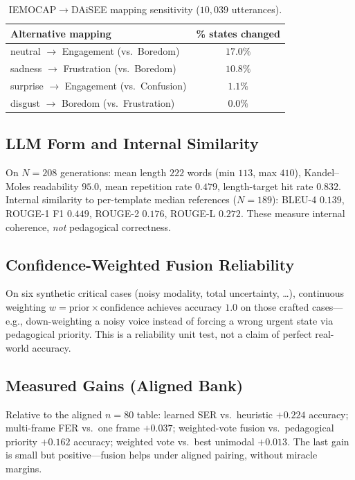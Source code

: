\documentclass[conference]{IEEEtran}
\begin{document}
\begin{table}[!t]
\caption{IEMOCAP$\rightarrow$DAiSEE mapping sensitivity ($10{,}039$ utterances).}
\label{tab:map}
\centering
\begin{tabular}{@{}lc@{}}
\toprule
\textbf{Alternative mapping} & \textbf{\% states changed} \\
\midrule
neutral $\rightarrow$ Engagement (vs.\ Boredom) & $17.0\%$ \\
sadness $\rightarrow$ Frustration (vs.\ Boredom) & $10.8\%$ \\
surprise $\rightarrow$ Engagement (vs.\ Confusion) & $1.1\%$ \\
disgust $\rightarrow$ Boredom (vs.\ Frustration) & $0.0\%$ \\
\bottomrule
\end{tabular}
\end{table}

\subsection{LLM Form and Internal Similarity}
On $N{=}208$ generations: mean length $222$ words (min $113$, max $410$),
Kandel--Moles readability $95.0$, mean repetition rate $0.479$, length-target
hit rate $0.832$. Internal similarity to per-template median references
($N{=}189$): BLEU-4 $0.139$, ROUGE-1 F1 $0.449$, ROUGE-2 $0.176$, ROUGE-L
$0.272$. These measure internal coherence, \emph{not} pedagogical
correctness.

\subsection{Confidence-Weighted Fusion Reliability}
On six synthetic critical cases (noisy modality, total uncertainty, \ldots),
continuous weighting $w=\mathrm{prior}\times\mathrm{confidence}$ achieves
accuracy $1.0$ on those crafted cases---e.g., down-weighting a noisy voice
instead of forcing a wrong urgent state via pedagogical priority. This is a
reliability unit test, not a claim of perfect real-world accuracy.

\subsection{Measured Gains (Aligned Bank)}
Relative to the aligned $n{=}80$ table: learned SER vs.\ heuristic
$+0.224$ accuracy; multi-frame FER vs.\ one frame $+0.037$; weighted-vote
fusion vs.\ pedagogical priority $+0.162$ accuracy; weighted vote vs.\ best
unimodal $+0.013$. The last gain is small but positive---fusion helps under
aligned pairing, without miracle margins.
\end{document}
